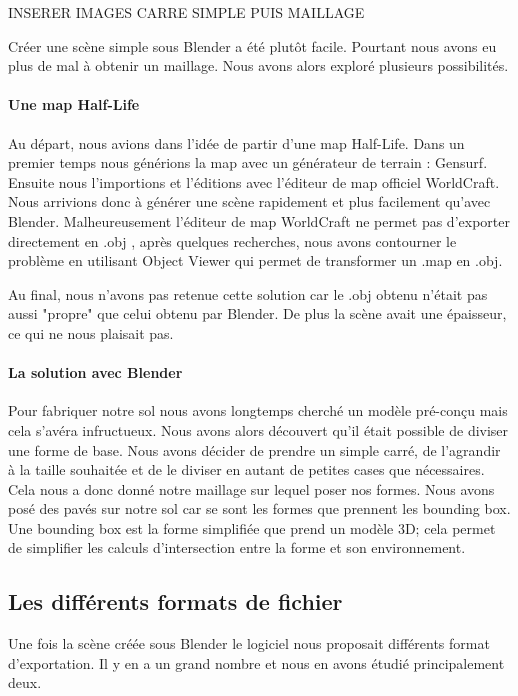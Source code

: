 \documentclass[a4paper,12pt]{report}
\begin{document}
INSERER IMAGES CARRE SIMPLE PUIS MAILLAGE

Créer une scène simple sous Blender a été plutôt facile. Pourtant nous avons eu plus de mal à obtenir un maillage. Nous avons alors exploré plusieurs possibilités.

\paragraph{Une map Half-Life}

Au départ, nous avions dans l'idée de partir d'une map Half-Life. Dans un premier temps nous générions la map avec un générateur de terrain : Gensurf. Ensuite nous l'importions et l'éditions avec l'éditeur de map officiel WorldCraft. Nous arrivions donc à générer une scène rapidement et plus facilement qu'avec Blender. 
Malheureusement l'éditeur de map WorldCraft ne permet pas d'exporter directement en .obj , après quelques recherches, nous avons contourner le problème en utilisant Object Viewer qui permet de transformer un .map en .obj.

Au final, nous n'avons pas retenue cette solution car le .obj obtenu n'était pas aussi "propre" que celui obtenu par Blender. De plus la scène avait une épaisseur, ce qui ne nous plaisait pas.

\paragraph{La solution avec Blender}

Pour fabriquer notre sol nous avons longtemps cherché un modèle pré-conçu mais cela s'avéra infructueux.
Nous avons alors découvert qu'il était possible de diviser une forme de base. Nous avons décider de prendre un simple carré, de l'agrandir à la taille souhaitée et de le diviser en autant de petites cases que nécessaires. Cela nous a donc donné notre maillage sur lequel poser nos formes.
Nous avons posé des pavés sur notre sol car se sont les formes que prennent les bounding box. Une bounding box est la forme simplifiée que prend un modèle 3D; cela permet de simplifier les calculs d'intersection entre la forme et son environnement.

\subsection{Les différents formats de fichier}

Une fois la scène créée sous Blender le logiciel nous proposait différents format d'exportation. Il y en a un grand nombre et nous en avons étudié principalement deux.
\end{document}
